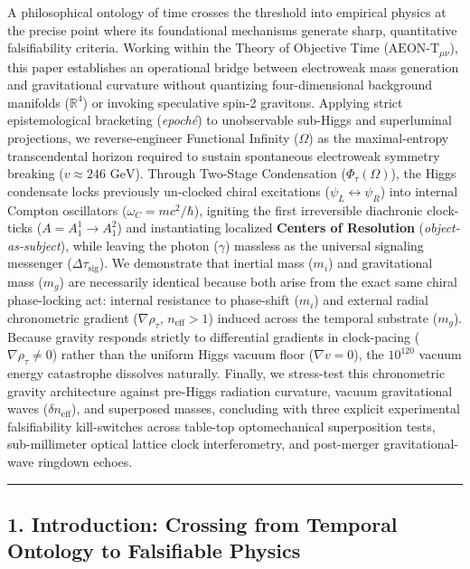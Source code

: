 \documentclass[
]{article}
\begin{document}
A philosophical ontology of time crosses the threshold into empirical
physics at the precise point where its foundational mechanisms generate
sharp, quantitative falsifiability criteria. Working within the Theory
of Objective Time (\(\text{AEON-T}_{\mu\nu}\)), this paper establishes
an operational bridge between electroweak mass generation and
gravitational curvature without quantizing four-dimensional background
manifolds (\(\mathbb{R}^4\)) or invoking speculative spin-2 gravitons.
Applying strict epistemological bracketing (\emph{epoché}) to
unobservable sub-Higgs and superluminal projections, we reverse-engineer
Functional Infinity (\(\Omega\)) as the maximal-entropy transcendental
horizon required to sustain spontaneous electroweak symmetry breaking
(\(v \approx 246\text{ GeV}\)). Through Two-Stage Condensation
(\(\Phi_\tau(\Omega)\)), the Higgs condensate locks previously
un-clocked chiral excitations (\(\psi_L \leftrightarrow \psi_R\)) into
internal Compton oscillators (\(\omega_C = mc^2/\hbar\)), igniting the
first irreversible diachronic clock-ticks (\(A = A_1^1 \to A_1^2\)) and
instantiating localized \textbf{Centers of Resolution}
(\emph{object-as-subject}), while leaving the photon (\(\gamma\))
massless as the universal signaling messenger
(\(\Delta\tau_{\mathrm{sig}}\)). We demonstrate that inertial mass
(\(m_i\)) and gravitational mass (\(m_g\)) are necessarily identical
because both arise from the exact same chiral phase-locking act:
internal resistance to phase-shift (\(m_i\)) and external radial
chronometric gradient (\(\nabla\rho_\tau\), \(n_{\mathrm{eff}} > 1\))
induced across the temporal substrate (\(m_g\)). Because gravity
responds strictly to differential gradients in clock-pacing
(\(\nabla\rho_\tau \neq 0\)) rather than the uniform Higgs vacuum floor
(\(\nabla v = 0\)), the \(10^{120}\) vacuum energy catastrophe dissolves
naturally. Finally, we stress-test this chronometric gravity
architecture against pre-Higgs radiation curvature, vacuum gravitational
waves (\(\delta n_{\mathrm{eff}}\)), and superposed masses, concluding
with three explicit experimental falsifiability kill-switches across
table-top optomechanical superposition tests, sub-millimeter optical
lattice clock interferometry, and post-merger gravitational-wave
ringdown echoes.

\begin{center}\rule{0.5\linewidth}{0.5pt}\end{center}

\subsection{1. Introduction: Crossing from Temporal Ontology to
Falsifiable
Physics}\label{introduction-crossing-from-temporal-ontology-to-falsifiable-physics}
\end{document}
